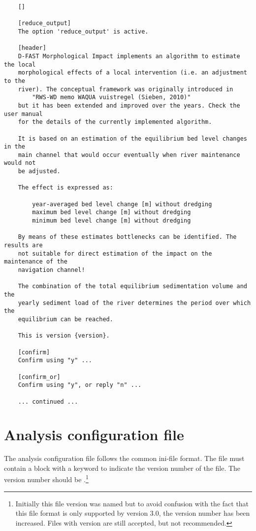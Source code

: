 \begin{Verbatim}
    []
    
    [reduce_output]
    The option 'reduce_output' is active.
    
    [header]
    D-FAST Morphological Impact implements an algorithm to estimate the local
    morphological effects of a local intervention (i.e. an adjustment to the
    river). The conceptual framework was originally introduced in
        "RWS-WD memo WAQUA vuistregel (Sieben, 2010)"
    but it has been extended and improved over the years. Check the user manual
    for the details of the currently implemented algorithm.
    
    It is based on an estimation of the equilibrium bed level changes in the
    main channel that would occur eventually when river maintenance would not
    be adjusted.
    
    The effect is expressed as:
    
        year-averaged bed level change [m] without dredging
        maximum bed level change [m] without dredging
        minimum bed level change [m] without dredging
    
    By means of these estimates bottlenecks can be identified. The results are
    not suitable for direct estimation of the impact on the maintenance of the
    navigation channel!
    
    The combination of the total equilibrium sedimentation volume and the
    yearly sediment load of the river determines the period over which the
    equilibrium can be reached.
    
    This is version {version}.
    
    [confirm]
    Confirm using "y" ...
    
    [confirm_or]
    Confirm using "y", or reply "n" ...
    
    ... continued ...
\end{Verbatim}

\section{Analysis configuration file}\label{app:config}

The analysis configuration file follows the common ini-file format.
The file must contain a \keyw{[General]} block with a keyword  to indicate the version number of the file.
The version number should be .\footnote{Initially this file version was named  but to avoid confusion with the fact that this file format is only supported by \dfastmi version 3.0, the version number has been increased.
Files with version  are still accepted, but not recommended.}

